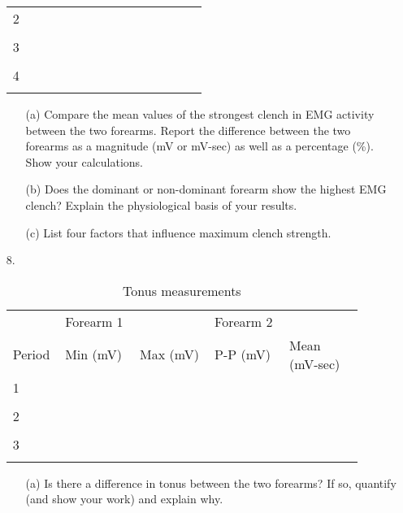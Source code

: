 \documentclass{article}
\begin{document}
\begin{itemize}
\begin{table}[h!]
\begin{tabular}[h!]{p{0.1\linewidth}|p{0.2\linewidth}p{0.2\linewidth}p{0.2\linewidth}p{0.2\linewidth}}
	\midrule
	2 & & & &\\& & & &\\
	\midrule
	3 & & & &\\& & & &\\
	\midrule
	4 & & & &\\& & & &\\
	\bottomrule
	\end{tabular}
	\end{table}
	
	\begin{itemize}
		\item[(a)] Compare the mean values of the strongest clench in EMG activity between the two forearms. Report the difference between the two forearms as a magnitude (mV or mV-sec) as well as a percentage (\%). Show your calculations.\vspace{6cm}
		\item[(b)] Does the dominant or non-dominant forearm show the highest EMG clench? Explain the physiological basis of your results.\vspace{5cm}
		\item[(c)] List four factors that influence maximum clench strength.\vspace{4cm}
	\end{itemize}
	
	\item[8.]
	\begin{table}[h!]
	\centering
	\caption{Tonus measurements}
	\begin{tabular}[h!]{p{0.1\linewidth}|p{0.2\linewidth}p{0.2\linewidth}|p{0.2\linewidth}p{0.2\linewidth}}
	\toprule
	& Forearm 1 & & Forearm 2 &\\
	Period & Min (mV) & Max (mV) & P-P (mV) & Mean (mV-sec)\\
	\midrule
	1 & & & &\\& & & &\\
	
	\midrule
	2 & & & &\\& & & &\\
	\midrule
	3 & & & &\\& & & &\\
	\bottomrule
	\end{tabular}
	\end{table}
	
	\begin{itemize}
		\item[(a)] Is there a difference in tonus between the two forearms? If so, quantify (and show your work) and explain why.\vspace{6cm}
	\end{itemize}
\end{itemize}
\end{document}
